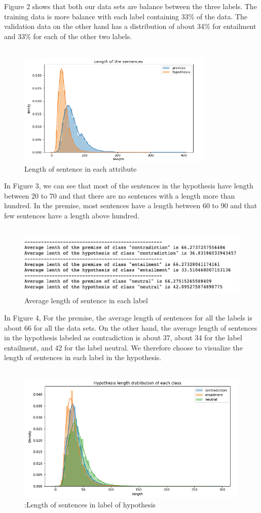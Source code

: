 \documentclass[runningheads]{llncs}
\begin{document}
Figure 2 shows that both our data sets are balance between the three labels. The training data is more balance with each label containing 33\% of the data. The validation data on the other hand has a distribution of about 34\% for entailment and 33\% for each of the other two labels.\\
\\
\begin{figure}
	\includegraphics[scale=1]{lensen.png}
	\centering
	\caption{Length of sentence in each attribute}
	\label{fig:dataset}
\end{figure}
In Figure 3, we can see that most of the sentences in the hypothesis have length between 20 to 70 and that there are no sentences with a length more than hundred. In the premise, most sentences have a length between 60 to 90 and that few sentences have a length above hundred.\\
\\
\begin{figure}
	\includegraphics[scale=0.8]{avesenlen.png}
	\centering
	\caption{Average length of sentence in each label}
	\label{fig:dataset}
\end{figure}
In Figure 4, For the premise, the average length of sentences for all the labels is about 66 for all the data sets. On the other hand, the average length of sentences in the hypothesis labeled as contradiction is about 37, about 34 for the label entailment, and 42 for the label neutral. We therefore choose to visualize the length of sentences in each label in the hypothesis.\\
\\
\begin{figure}
	\includegraphics[scale=0.8]{hypsenlen.png}
	\centering
	\caption{:Length of sentences in label of hypothesis}
	\label{fig:dataset}
\end{figure}
\end{document}
